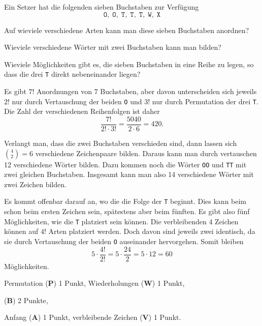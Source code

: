 Ein Setzer hat die folgenden sieben Buchstaben zur Verfügung
\[
\texttt{O},\;
\texttt{O},\;
\texttt{T},\;
\texttt{T},\;
\texttt{T},\;
\texttt{W},\;
\texttt{X}
\]
\begin{teilaufgaben}
\item Auf wieviele verschiedene Arten kann man diese sieben Buchstaben anordnen?
\item Wieviele verschiedene Wörter mit zwei Buchstaben kann man bilden?
\item Wieviele Möglichkeiten gibt es, die sieben Buchstaben in eine Reihe
zu legen, so dass die drei \texttt{T} direkt nebeneinander liegen?
\end{teilaufgaben}

\begin{loesung}
\begin{teilaufgaben}
\item
Es gibt $7!$ Anordnungen von $7$ Buchstaben, aber davon unterscheiden sich
jeweils $2!$ nur durch Vertauschung der beiden \texttt{O} und $3!$ nur
durch Permutation der drei \texttt{T}.
Die Zahl der verschiedenen Reihenfolgen ist daher
\[
\frac{7!}{2!\cdot 3!}=\frac{5040}{2\cdot 6} = 420.
\]
\item
Verlangt man, dass die zwei Buchstaben verschieden sind, dann lassen sich
$\binom{4}{2}=6$ verschiedene Zeichenpaare bilden.
Daraus kann man durch vertauschen 12 verschiedene Wörter bilden.
Dazu kommen noch die Wörter \texttt{OO} und \texttt{TT} mit zwei gleichen
Buchstaben.
Insgesamt kann man also 14 verschiedene Wörter mit zwei Zeichen bilden.
\item
Es kommt offenbar darauf an, wo die die Folge der \texttt{T} beginnt.
Dies kann beim schon beim ersten Zeichen sein, spätestens aber beim fünften.
Es gibt also fünf Möglichkeiten, wie die \texttt{T} platziert sein können.
Die verbleibenden 4 Zeichen können auf $4!$ Arten platziert werden.
Doch davon sind jeweils zwei identisch, da sie durch Vertauschung der
beiden \texttt{O} auseinander hervorgehen.
Somit bleiben 
\[
5\cdot\frac{4!}{2!}=5\cdot \frac{24}{2}=5\cdot 12=60
\]
Möglichkeiten.
\end{teilaufgaben}
\end{loesung}

\begin{bewertung}
\begin{teilaufgaben}
\item Permutation ({\bf P}) 1 Punkt, Wiederholungen ({\bf W}) 1 Punkt,
\item ({\bf B}) 2 Punkte,
\item Anfang ({\bf A}) 1 Punkt, verbleibende Zeichen ({\bf V}) 1 Punkt.
\end{teilaufgaben}
\end{bewertung}

